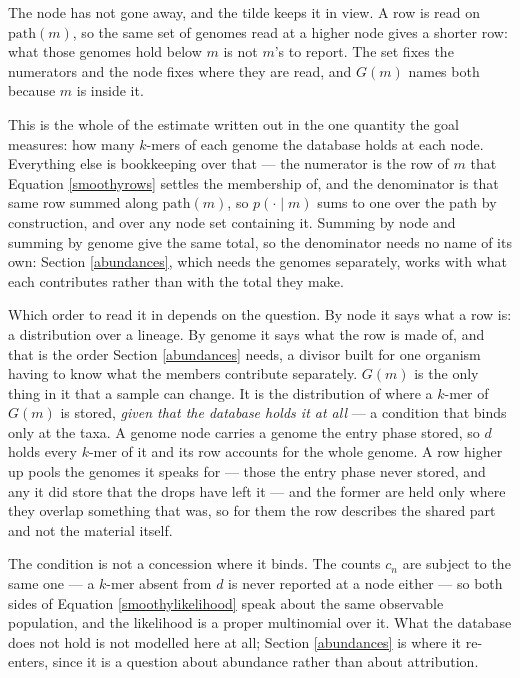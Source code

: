 \documentclass[pdflatex,sn-vancouver-num]{sn-jnl}
\begin{document}
    The node has not gone away, and the tilde keeps it in view. A row is read on $\mathrm{path}(m)$,
    so the same set of genomes read at a higher node gives a shorter row: what those genomes hold
    below $m$ is not $m$'s to report. The set fixes the numerators and the node fixes where they are
    read, and $G(m)$ names both because $m$ is inside it.

    This is the whole of the estimate written out in the one quantity the goal measures: how many
    $k$-mers of each genome the database holds at each node. Everything else is bookkeeping over that
    --- the numerator is the row of $m$ that Equation \eqref{smoothyrows} settles the membership of,
    and the denominator is that same row summed along $\mathrm{path}(m)$, so
    $p(\cdot \mid m)$ sums to one over the path by construction, and over any node set
    containing it. Summing by node and summing by genome give the same total, so the denominator needs
    no name of its own: Section \ref{abundances}, which needs the genomes separately, works with what
    each contributes rather than with the total they make.

    Which order to read it in depends on the question. By node it says what a row is: a distribution
    over a lineage. By genome it says what the row is made of, and that is the order
    Section \ref{abundances} needs, a divisor built for one organism having to know what the members
    contribute separately. $G(m)$ is the only thing in it that a sample can change.
    It is the distribution of where a $k$-mer of $G(m)$ is stored, \emph{given that the database holds
    it at all} --- a condition that binds only at the taxa. A genome node carries a genome the entry
    phase stored, so $d$ holds every $k$-mer of it and its row accounts for the whole genome. A
    row higher up pools the genomes it speaks for --- those the entry phase never stored, and any it
    did store that the drops have left it --- and the former are held only where they overlap
    something that was, so for them the row describes the shared part and not the material itself.

    The condition is not a concession where it binds. The counts $c_n$ are subject to the same one --- a $k$-mer absent from $d$ is never
    reported at a node either --- so both sides of
    Equation \eqref{smoothylikelihood} speak about the
    same observable population, and the likelihood is a proper multinomial over it. What the database
    does not hold is not modelled here at all; Section \ref{abundances} is where it re-enters, since
    it is a question about abundance rather than about attribution.
\end{document}
